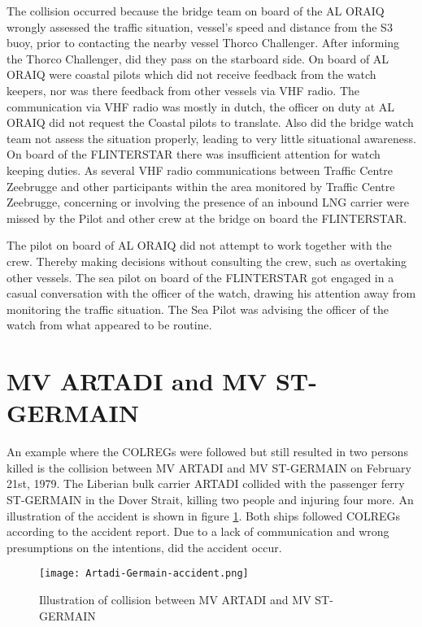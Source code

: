 The collision occurred because the bridge team on board of the AL ORAIQ wrongly assessed the traffic situation, vessel's speed and distance from the S3 buoy, prior to contacting the nearby vessel Thorco Challenger. After informing the Thorco Challenger, did they pass on the starboard side. On board of AL ORAIQ were coastal pilots which did not receive feedback from the watch keepers, nor was there feedback from other vessels via \ac{VHF} radio. The communication via VHF radio was mostly in dutch, the officer on duty at AL ORAIQ did not request the Coastal pilots to translate. Also did the bridge watch team not assess the situation properly, leading to very little situational awareness.
On board of the FLINTERSTAR there was insufficient attention for watch keeping duties. As several VHF radio communications between Traffic Centre Zeebrugge and other participants within the area monitored by Traffic Centre Zeebrugge, concerning or involving the presence of an inbound LNG carrier were missed by the Pilot and other crew at the bridge on board the FLINTERSTAR.

The pilot on board of AL ORAIQ did not attempt to work together with the crew. Thereby making decisions without consulting the crew, such as overtaking other vessels. 
The sea pilot on board of the FLINTERSTAR got engaged in a casual conversation with the officer of the watch, drawing his attention away from monitoring the traffic situation. The Sea Pilot was advising the officer of the watch from what appeared to be routine. \cite{Backer2015}

\newpage
\section{MV ARTADI and MV ST-GERMAIN}
\label{sec:artadiVSst-germain}
An example where the \ac{COLREGs} were followed but still resulted in two persons killed is the collision between MV ARTADI and MV ST-GERMAIN on February 21st, 1979. The Liberian bulk carrier ARTADI collided with the passenger ferry ST-GERMAIN in the Dover Strait, killing two people and injuring four more. An illustration of the accident is shown in figure \ref{fig:Artadi-Germain}. Both ships followed  \ac{COLREGs} according to the accident report. Due to a lack of communication and wrong presumptions on the intentions, did the accident occur.

\begin{figure}[H]
	\centering
	\texttt{[image: Artadi-Germain-accident.png]}
	\caption{Illustration of collision between MV ARTADI and MV ST-GERMAIN}
	\label{fig:Artadi-Germain}
\end{figure}

